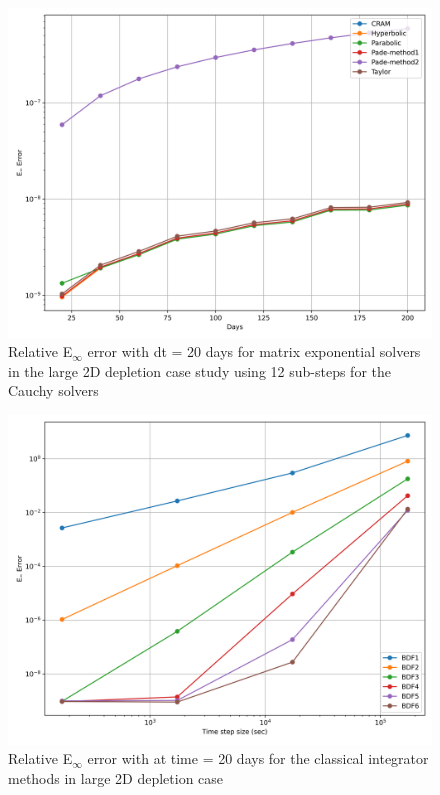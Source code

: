 \begin{figure}[p]
    \centering
    \includegraphics[width=5in]{images/chapter-5/caseStudies/large2DDepletion/msrLarge2DDepletionEinfErrorerrorSteps12.png}
    \caption{Relative E$_{\infty}$ error with dt = 20 days for matrix exponential solvers in the large 2D depletion case study using 12 sub-steps for the Cauchy solvers}
    \label{fig:large_2D_depletion_Einf_steps12}
\end{figure}

\clearpage

\begin{figure}[p]
    \centering
    \includegraphics[width=5in]{images/chapter-5/caseStudies/large2DDepletion/msrLarge2DDepletionEinfErrorerrorIntegrators.png}
    \caption{Relative E$_{\infty}$ error with at time = 20 days for the classical integrator methods in large 2D depletion case}
    \label{fig:large_2D_depletion_Einf_integrators}
\end{figure}

